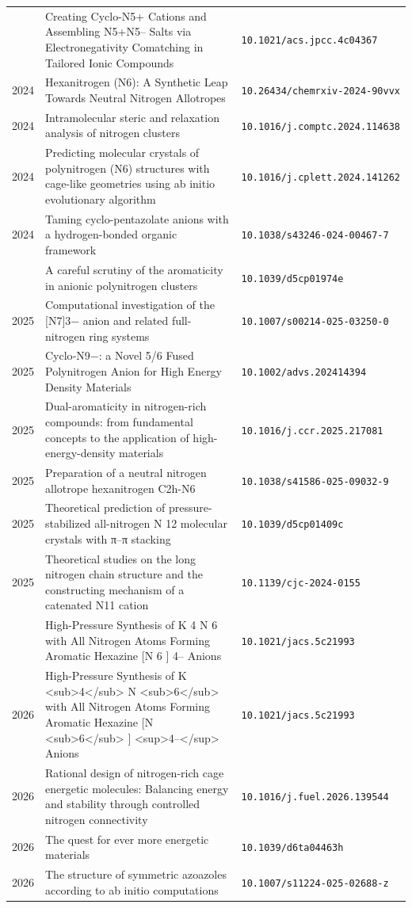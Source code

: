 \begin{longtable}{@{}p{1.0cm}p{10.5cm}p{3.5cm}@{}}
\addlinespace
2024 & Creating Cyclo-N5+ Cations and Assembling N5+N5– Salts via Electronegativity Comatching in Tailored Ionic Compounds & \small\texttt{10.1021/acs.jpcc.4c04367} \\
2024 & Hexanitrogen (N6): A Synthetic Leap Towards Neutral Nitrogen Allotropes & \small\texttt{10.26434/chemrxiv-2024-90vvx} \\
2024 & Intramolecular steric and relaxation analysis of nitrogen clusters & \small\texttt{10.1016/j.comptc.2024.114638} \\
2024 & Predicting molecular crystals of polynitrogen (N6) structures with cage-like geometries using ab initio evolutionary algorithm & \small\texttt{10.1016/j.cplett.2024.141262} \\
2024 & Taming cyclo-pentazolate anions with a hydrogen-bonded organic framework & \small\texttt{10.1038/s43246-024-00467-7} \\
\addlinespace
2025 & A careful scrutiny of the aromaticity in anionic polynitrogen clusters & \small\texttt{10.1039/d5cp01974e} \\
2025 & Computational investigation of the [N7]3− anion and related full-nitrogen ring systems & \small\texttt{10.1007/s00214-025-03250-0} \\
2025 & Cyclo‐N9−: a Novel 5/6 Fused Polynitrogen Anion for High Energy Density Materials & \small\texttt{10.1002/advs.202414394} \\
2025 & Dual-aromaticity in nitrogen-rich compounds: from fundamental concepts to the application of high-energy-density materials & \small\texttt{10.1016/j.ccr.2025.217081} \\
2025 & Preparation of a neutral nitrogen allotrope hexanitrogen C2h-N6 & \small\texttt{10.1038/s41586-025-09032-9} \\
2025 & Theoretical prediction of pressure-stabilized all-nitrogen N 12 molecular crystals with π–π stacking & \small\texttt{10.1039/d5cp01409c} \\
2025 & Theoretical studies on the long nitrogen chain structure and the constructing mechanism of a catenated N11 cation & \small\texttt{10.1139/cjc-2024-0155} \\
\addlinespace
2026 & High-Pressure Synthesis of K 4 N 6 with All Nitrogen Atoms Forming Aromatic Hexazine [N 6 ] 4– Anions & \small\texttt{10.1021/jacs.5c21993} \\
2026 & High-Pressure Synthesis of K <sub>4</sub> N <sub>6</sub> with All Nitrogen Atoms Forming Aromatic Hexazine [N <sub>6</sub> ] <sup>4–</sup> Anions & \small\texttt{10.1021/jacs.5c21993} \\
2026 & Rational design of nitrogen-rich cage energetic molecules: Balancing energy and stability through controlled nitrogen connectivity & \small\texttt{10.1016/j.fuel.2026.139544} \\
2026 & The quest for ever more energetic materials & \small\texttt{10.1039/d6ta04463h} \\
2026 & The structure of symmetric azoazoles according to ab initio computations & \small\texttt{10.1007/s11224-025-02688-z} \\
\end{longtable}
